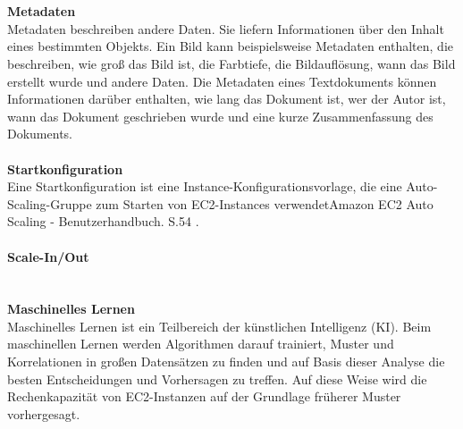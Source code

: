 \\\\
\textbf{Metadaten}\\
Metadaten beschreiben andere Daten. Sie liefern Informationen über den Inhalt eines bestimmten Objekts. Ein Bild kann beispielsweise Metadaten enthalten, die beschreiben, wie groß das Bild ist, die Farbtiefe, die Bildauflösung, wann das Bild erstellt wurde und andere Daten. Die Metadaten eines Textdokuments können Informationen darüber enthalten, wie lang das Dokument ist, wer der Autor ist, wann das Dokument geschrieben wurde und eine kurze Zusammenfassung des Dokuments.
\\\\
\textbf{Startkonfiguration}\\ 
Eine Startkonfiguration ist eine Instance-Konfigurationsvorlage, die eine Auto-Scaling-Gruppe zum Starten von EC2-Instances verwendet{Amazon EC2 Auto Scaling - Benutzerhandbuch. S.54 \cite{AMZ31}}. 
\\\\
\textbf{Scale-In/Out}\\
\\\\
\textbf{Maschinelles Lernen}\\
Maschinelles Lernen ist ein Teilbereich der künstlichen Intelligenz (KI). Beim maschinellen Lernen werden Algorithmen darauf trainiert, Muster und Korrelationen in großen Datensätzen zu finden und auf Basis dieser Analyse die besten Entscheidungen und Vorhersagen zu treffen. Auf diese Weise wird die Rechenkapazität von EC2-Instanzen auf der Grundlage früherer Muster vorhergesagt\cite{ML1}. 
